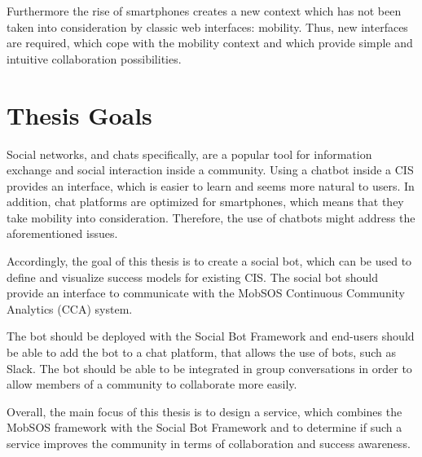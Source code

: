 Furthermore the rise of smartphones creates a new context which has not been taken into consideration by classic web interfaces: mobility.
Thus, new interfaces are required, which cope with the mobility context and which provide simple and intuitive collaboration possibilities.

\section{Thesis Goals}

Social networks, and chats specifically, are a popular tool for information exchange and social interaction inside a community.
Using a chatbot inside a CIS provides an interface, which is easier to learn and seems more natural to users.
In addition, chat platforms are optimized for smartphones, which means that they take mobility into consideration. Therefore, the use of chatbots might address the aforementioned issues.

Accordingly, the goal of this thesis is to create a social bot, which can be used to define and visualize success models for existing CIS. The social bot should provide an interface to communicate with the MobSOS Continuous Community Analytics (CCA) system.

The bot should be deployed with the Social Bot Framework and end-users should be able to add the bot to a chat platform, that allows the use of bots, such as Slack.
The bot should be able to be integrated in group conversations in order to allow members of a community to collaborate more easily.

Overall, the main focus of this thesis is to design a service, which combines the MobSOS framework with the Social Bot Framework and to determine if such a service improves the community in terms of collaboration and success awareness.



